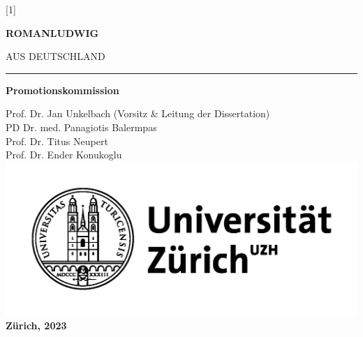 \documentclass[\relativeRoot/main.tex]{subfiles}
\begin{document}
\begin{titlepage}
\begin{center}
            \scalebox{1.2}[1]{\begin{minipage}{0.7\textwidth}
                \centering
                \bfseries
                \huge
                \ttfamily
                ROMAN\hspace{2.5mm}LUDWIG
            \end{minipage}} \vfill

            {\footnotesize AUS DEUTSCHLAND} \vspace{3cm}
            
            \rule{2cm}{0.5pt} \vspace{5mm}
            
            \textbf{Promotionskommission}

            Prof. Dr. {\sc Jan Unkelbach} {\small (Vorsitz \& Leitung der Dissertation)}\\
            PD Dr. med. {\sc Panagiotis Balermpas}\\
            Prof. Dr. {\sc Titus Neupert}\\
            Prof. Dr. {\sc Ender Konukoglu}\\
            \includegraphics[scale=1.0]{figures/uzh_logo_d_pos_standard.png}\\
            \textbf{Zürich, 2023} \vfill
                
        \end{center}
    \end{titlepage}
\end{document}
